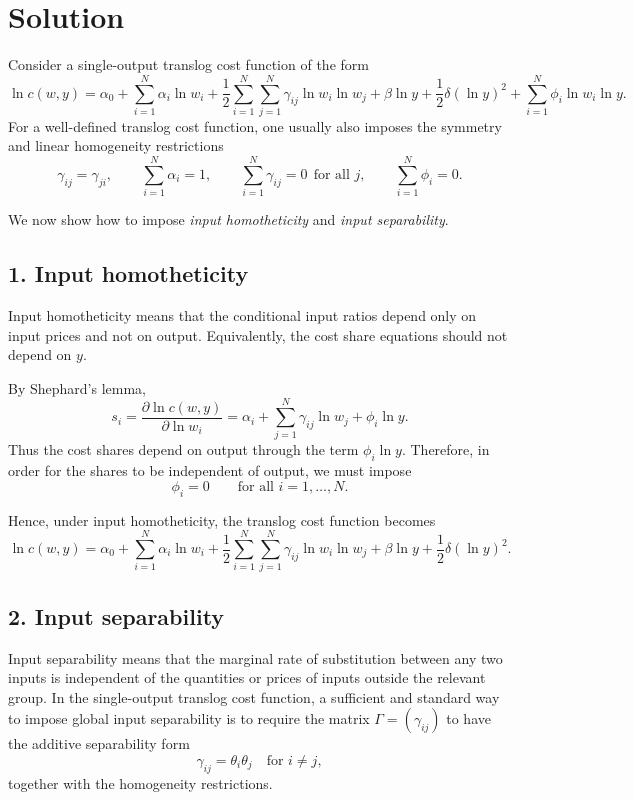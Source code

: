 \section*{Solution}

Consider a single-output translog cost function of the form
\[
\ln c(w,y)
=
\alpha_0
+
\sum_{i=1}^N \alpha_i \ln w_i
+
\frac{1}{2}\sum_{i=1}^N \sum_{j=1}^N \gamma_{ij}\ln w_i \ln w_j
+
\beta \ln y
+
\frac{1}{2}\delta (\ln y)^2
+
\sum_{i=1}^N \phi_i \ln w_i \ln y.
\]
For a well-defined translog cost function, one usually also imposes the symmetry and linear homogeneity restrictions
\[
\gamma_{ij}=\gamma_{ji},
\qquad
\sum_{i=1}^N \alpha_i=1,
\qquad
\sum_{i=1}^N \gamma_{ij}=0 \ \ \text{for all } j,
\qquad
\sum_{i=1}^N \phi_i=0.
\]

We now show how to impose \emph{input homotheticity} and \emph{input separability}.

\subsection*{1. Input homotheticity}

Input homotheticity means that the conditional input ratios depend only on input prices and not on output. Equivalently, the cost share equations should not depend on \(y\).

By Shephard's lemma,
\[
s_i
=
\frac{\partial \ln c(w,y)}{\partial \ln w_i}
=
\alpha_i+\sum_{j=1}^N \gamma_{ij}\ln w_j+\phi_i \ln y.
\]
Thus the cost shares depend on output through the term \(\phi_i \ln y\). Therefore, in order for the shares to be independent of output, we must impose
\[
\boxed{\phi_i=0 \qquad \text{for all } i=1,\dots,N.}
\]

Hence, under input homotheticity, the translog cost function becomes
\[
\ln c(w,y)
=
\alpha_0
+
\sum_{i=1}^N \alpha_i \ln w_i
+
\frac{1}{2}\sum_{i=1}^N \sum_{j=1}^N \gamma_{ij}\ln w_i \ln w_j
+
\beta \ln y
+
\frac{1}{2}\delta (\ln y)^2.
\]

\subsection*{2. Input separability}

Input separability means that the marginal rate of substitution between any two inputs is independent of the quantities or prices of inputs outside the relevant group. In the single-output translog cost function, a sufficient and standard way to impose global input separability is to require the matrix \(\Gamma=(\gamma_{ij})\) to have the additive separability form
\[
\gamma_{ij}=\theta_i\theta_j
\quad \text{for } i\neq j,
\]
together with the homogeneity restrictions.

